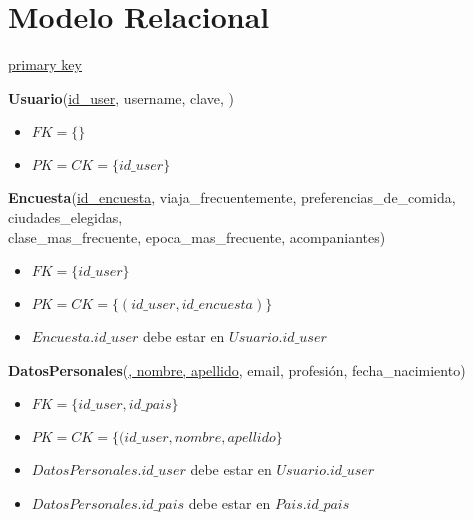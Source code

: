 \section{Modelo Relacional}

\begin{framed} \centering
  \underline{primary key} \hspace*{3cm}
\end{framed}

\vspace*{0.1cm}
\noindent
\textbf{Usuario}(\underline{id\_user}, username, clave, 
    )
\begin{itemize}[noitemsep]
	\item $FK = \{ \}$
	\item $PK = CK = \{id\_user\}$
\end{itemize}


\vspace*{0.1cm}
\noindent
\textbf{Encuesta}(\underline{id\_encuesta},
	viaja\_frecuentemente, preferencias\_de\_comida, ciudades\_elegidas, \\
	\hspace*{2cm} clase\_mas\_frecuente, epoca\_mas\_frecuente, acompaniantes)
\begin{itemize}[noitemsep]
	\item $FK = \{id\_user\}$
	\item $PK = CK = \{(id\_user, id\_encuesta)\}$
	\item $Encuesta.id\_user$ debe estar en $Usuario.id\_user$
\end{itemize}

\vspace*{0.1cm}
\noindent
\textbf{DatosPersonales}(\underline{, nombre, apellido},
	email, profesión, fecha\_nacimiento)
\begin{itemize}[noitemsep]
	\item $FK = \{id\_user, id\_pais\}$
	\item $PK = CK = \{(id\_user, nombre, apellido\}$
	\item $DatosPersonales.id\_user$ debe estar en $Usuario.id\_user$
	\item $DatosPersonales.id\_pais$ debe estar en $Pais.id\_pais$
\end{itemize}

